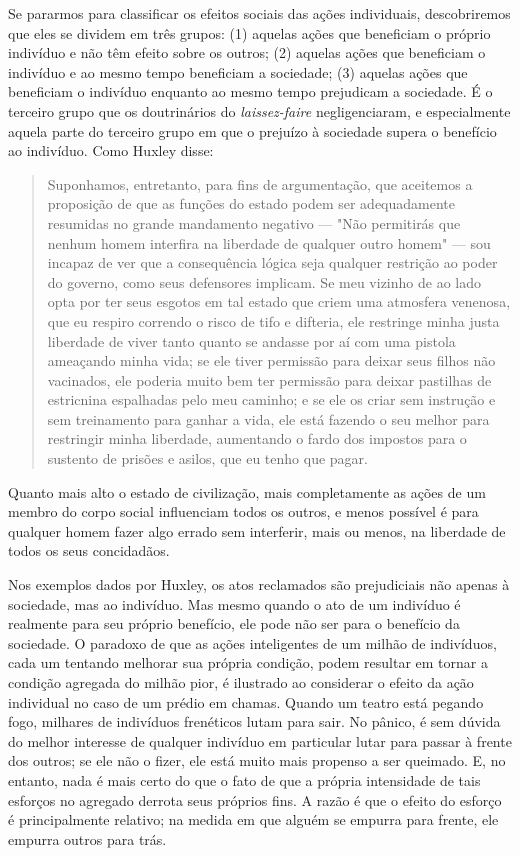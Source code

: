 \documentclass[12pt]{article}
\begin{document}
Se pararmos para classificar os efeitos sociais das ações individuais, descobriremos que eles se dividem em três grupos: (1) aquelas ações que beneficiam o próprio indivíduo e não têm efeito sobre os outros; (2) aquelas ações que beneficiam o indivíduo e ao mesmo tempo beneficiam a sociedade; (3) aquelas ações que beneficiam o indivíduo enquanto ao mesmo tempo prejudicam a sociedade. É o terceiro grupo que os doutrinários do \textit{laissez-faire} negligenciaram, e especialmente aquela parte do terceiro grupo em que o prejuízo à sociedade supera o benefício ao indivíduo. Como Huxley disse:

\begin{quote}
Suponhamos, entretanto, para fins de argumentação, que aceitemos a proposição de que as funções do estado podem ser adequadamente resumidas no grande mandamento negativo — "Não permitirás que nenhum homem interfira na liberdade de qualquer outro homem" — sou incapaz de ver que a consequência lógica seja qualquer restrição ao poder do governo, como seus defensores implicam. Se meu vizinho de ao lado opta por ter seus esgotos em tal estado que criem uma atmosfera venenosa, que eu respiro correndo o risco de tifo e difteria, ele restringe minha justa liberdade de viver tanto quanto se andasse por aí com uma pistola ameaçando minha vida; se ele tiver permissão para deixar seus filhos não vacinados, ele poderia muito bem ter permissão para deixar pastilhas de estricnina espalhadas pelo meu caminho; e se ele os criar sem instrução e sem treinamento para ganhar a vida, ele está fazendo o seu melhor para restringir minha liberdade, aumentando o fardo dos impostos para o sustento de prisões e asilos, que eu tenho que pagar.
\end{quote}

Quanto mais alto o estado de civilização, mais completamente as ações de um membro do corpo social influenciam todos os outros, e menos possível é para qualquer homem fazer algo errado sem interferir, mais ou menos, na liberdade de todos os seus concidadãos.

Nos exemplos dados por Huxley, os atos reclamados são prejudiciais não apenas à sociedade, mas ao indivíduo. Mas mesmo quando o ato de um indivíduo é realmente para seu próprio benefício, ele pode não ser para o benefício da sociedade. O paradoxo de que as ações inteligentes de um milhão de indivíduos, cada um tentando melhorar sua própria condição, podem resultar em tornar a condição agregada do milhão pior, é ilustrado ao considerar o efeito da ação individual no caso de um prédio em chamas. Quando um teatro está pegando fogo, milhares de indivíduos frenéticos lutam para sair. No pânico, é sem dúvida do melhor interesse de qualquer indivíduo em particular lutar para passar à frente dos outros; se ele não o fizer, ele está muito mais propenso a ser queimado. E, no entanto, nada é mais certo do que o fato de que a própria intensidade de tais esforços no agregado derrota seus próprios fins. A razão é que o efeito do esforço é principalmente relativo; na medida em que alguém se empurra para frente, ele empurra outros para trás.
\end{document}
